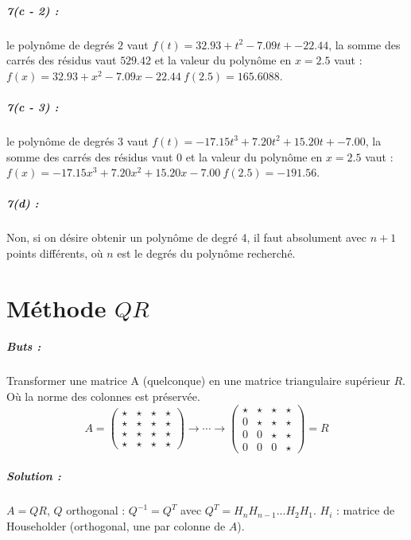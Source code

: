 \documentclass[a4paper,9pt]{extarticle}
\begin{document}
\paragraph*{7(c - 2) : } le polynôme de degrés $2$ vaut $f(t)=32.93+t^2-7.09t+-22.44$, la somme des carrés des résidus vaut $529.42$ et la valeur du polynôme en $x=2.5$ vaut : $f(x)=32.93+x^2-7.09x-22.44 \ f(2.5)=165.6088$.

\paragraph*{7(c - 3) : } le polynôme de degrés $3$ vaut $f(t)=-17.15t^3+7.20t^2+15.20t+-7.00$, la somme des carrés des résidus vaut $0$ et la valeur du polynôme en $x=2.5$ vaut : $f(x)=-17.15x^3+7.20x^2+15.20x-7.00 \ f(2.5)=-191.56$.


\paragraph*{7(d) : } Non, si on désire obtenir un polynôme de degré 4, il faut absolument avec $n+1$ points différents, où $n$ est le degrés du polynôme recherché.

\chapter{Méthode $QR$}

\paragraph*{Buts : } Transformer une matrice A (quelconque) en une matrice triangulaire supérieur $R$. Où la norme des colonnes est préservée.
$$
A = \begin{pmatrix}
\star & \star & \star & \star \\
\star & \star & \star & \star \\
\star & \star & \star & \star \\
\star & \star & \star & \star
\end{pmatrix}
\rightarrow \cdots \rightarrow
\begin{pmatrix}
\star & \star & \star & \star \\
0 & \star & \star & \star \\
0 & 0 & \star & \star \\
0 & 0 & 0 & \star
\end{pmatrix}
= R
$$

\paragraph*{Solution : } $A=QR$, $Q$ orthogonal : $Q^{-1} = Q^T$ avec $Q^T = H_nH_{n-1}...H_2H_1$. $H_i$ : matrice de Householder (orthogonal, une par colonne de $A$).
\end{document}

